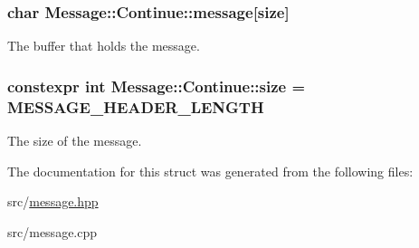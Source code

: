 \subsubsection[{\texorpdfstring{message}{message}}]{\setlength{\rightskip}{0pt plus 5cm}char Message\+::\+Continue\+::message\mbox{[}{\bf size}\mbox{]}}\hypertarget{struct_message_1_1_continue_a42a1bf71c1b2dbb2022979472a036367}{}\label{struct_message_1_1_continue_a42a1bf71c1b2dbb2022979472a036367}


The buffer that holds the message. 

\subsubsection[{\texorpdfstring{size}{size}}]{\setlength{\rightskip}{0pt plus 5cm}constexpr int Message\+::\+Continue\+::size = {\bf M\+E\+S\+S\+A\+G\+E\+\_\+\+H\+E\+A\+D\+E\+R\+\_\+\+L\+E\+N\+G\+TH}\hspace{0.3cm}{\ttfamily [static]}}\hypertarget{struct_message_1_1_continue_a11f9268149d7d619ae87aaf575365919}{}\label{struct_message_1_1_continue_a11f9268149d7d619ae87aaf575365919}


The size of the message. 



The documentation for this struct was generated from the following files\+:\begin{DoxyCompactItemize}
\item 
src/\hyperlink{message_8hpp}{message.\+hpp}\item 
src/message.\+cpp\end{DoxyCompactItemize}
